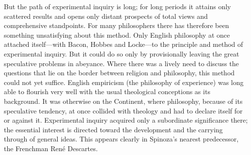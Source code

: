 \documentclass[12pt]{book}
\newcommand{\opage}[1]{\marginnote{\footnotesize\textit{[#1]}}}
\begin{document}
But the path of experimental inquiry is long; for long periods it attains only
scattered results and opens only distant prospects of total views and comprehensive
standpoints. For many philosophers there has therefore been something unsatisfying
about this method. Only \opage{13}English philosophy at once attached itself---with
Bacon, Hobbes and Locke---to the principle and method of experimental inquiry. But
it could do so only by provisionally leaving the great speculative problems in
abeyance. Where there was a lively need to discuss the questions that lie on the
border between religion and philosophy, this method could not yet suffice. English
empiricism (the philosophy of experience) was long able to flourish very well with
the usual theological conceptions as its background. It was otherwise on the
Continent, where philosophy, because of its speculative tendency, at once collided
with theology and had to declare itself for or against it. Experimental inquiry
acquired only a subordinate significance there; the essential interest is directed
toward the development and the carrying through of general ideas. This appears
clearly in Spinoza's nearest predecessor, the Frenchman René Descartes.
\end{document}
